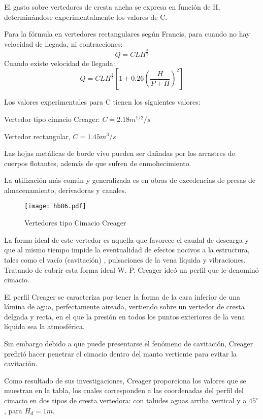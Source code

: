 El gasto sobre vertedores de cresta ancha se expresa en función de H, determinándose experimentalmente los valores de C.

Para la fórmula en vertedores rectangulares según Francis, para cuando no hay velocidad de llegada, ni contracciones:
\begin{equation}
    Q = CLH^{\frac{3}{2}}
\end{equation}
Cuando existe velocidad de llegada:
\begin{equation}
    Q = CLH^{\frac{3}{2}}\left[1 +0.26\left(\frac{H}{P + H}\right)^2 \right]
\end{equation}

Los valores experimentales para C tienen los siguientes valores:

Vertedor tipo cimacio Creager: $C=2.18 m^{1/2}/s$

Vertedor rectangular, $C=1.45 m^3/s$

Las hojas metálicas de borde vivo pueden ser dañadas por los arrastres de cuerpos flotantes, además de que sufren de enmohecimiento.

La utilización más común y generalizada es en obras de excedencias de presas de almacenamiento, derivadoras y canales.
\begin{figure}[h!]
\centering
  \texttt{[image: hb86.pdf]}
  \caption{Vertedores tipo Cimacio Creager}
  \label{hb86}
\end{figure}
La forma ideal de este vertedor es aquella que favorece el caudal de descarga y que al mismo tiempo impide la eventualidad de efectos nocivos a la estructura, tales como el vacío (cavitación) , pulsaciones de la vena líquida y vibraciones. Tratando de cubrir esta forma ideal W. P. Creager ideó un perfil que le denominó cimacio.

El perfil Creager se caracteriza por tener la forma de la cara inferior de una lámina de agua, perfectamente aireada, vertiendo sobre un vertedor de cresta delgada y recta, en el que la presión en todos los puntos exteriores de la vena líquida sea la atmosférica.

Sin embargo debido a que puede presentarse el fenómeno de cavitación, Creager prefirió hacer penetrar el cimacio dentro del manto vertiente para evitar la cavitación.

Como resultado de sus investigaciones, Creager proporciona los valores que se muestran en la tabla, los cuales corresponden a las coordenadas del perfil del cimacio en dos tipos de cresta vertedora: con taludes aguas arriba vertical y a $45^{\circ}$, para $H_d=1m$.

